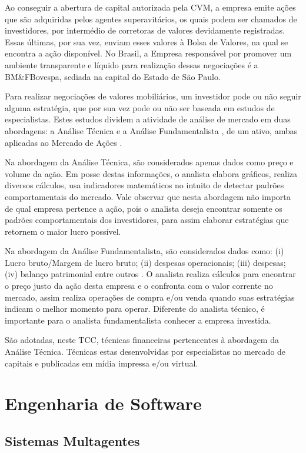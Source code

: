 Ao conseguir a abertura de capital autorizada pela CVM, a empresa emite ações que são adquiridas pelos agentes superavitários, os quais podem ser chamados de investidores, por intermédio de corretoras de valores devidamente registradas. Essas últimas, por sua vez, enviam esses valores à Bolsa de Valores, na qual se encontra a ação disponível. No Brasil, a Empresa responsável por promover um ambiente transparente e líquido para realização dessas negociações é a BM\&FBovespa, sediada na capital do Estado de São Paulo.

Para realizar negociações de valores mobiliários, um investidor pode ou não seguir alguma estratégia, que por sua vez pode ou não ser baseada em estudos de especialistas. Estes estudos dividem a atividade de análise de mercado em duas abordagens: a Análise Técnica \cite{noronha2010} e a Análise Fundamentalista \cite{buffet2010}, de um ativo, ambas aplicadas ao Mercado de Ações .

Na abordagem da Análise Técnica, são considerados apenas dados como preço e volume da ação. Em posse destas informações, o analista elabora gráficos, realiza diversos cálculos, usa indicadores matemáticos no intuito de detectar padrões comportamentais do mercado. Vale observar que nesta abordagem não importa de qual empresa pertence a ação, pois o analista deseja encontrar somente os padrões comportamentais dos investidores, para assim elaborar estratégias que retornem o maior lucro possível.

Na abordagem da Análise Fundamentalista, são considerados dados como: (i) Lucro bruto/Margem de lucro bruto; (ii) despesas operacionais; (iii) despesas; (iv) balanço patrimonial  entre outros \cite{buffet2010}. O analista realiza cálculos para encontrar o preço justo da ação desta empresa e o confronta com o valor corrente no mercado, assim realiza operações de compra e/ou venda quando suas estratégias indicam o melhor momento para operar. Diferente do analista técnico, é importante para o analista fundamentalista conhecer a empresa investida.

São adotadas, neste TCC, técnicas financeiras pertencentes à abordagem da Análise Técnica. Técnicas estas desenvolvidas por especialistas no mercado de capitais e publicadas em mídia impressa e/ou virtual.


\section{Engenharia de Software}
\subsection{Sistemas Multagentes}
